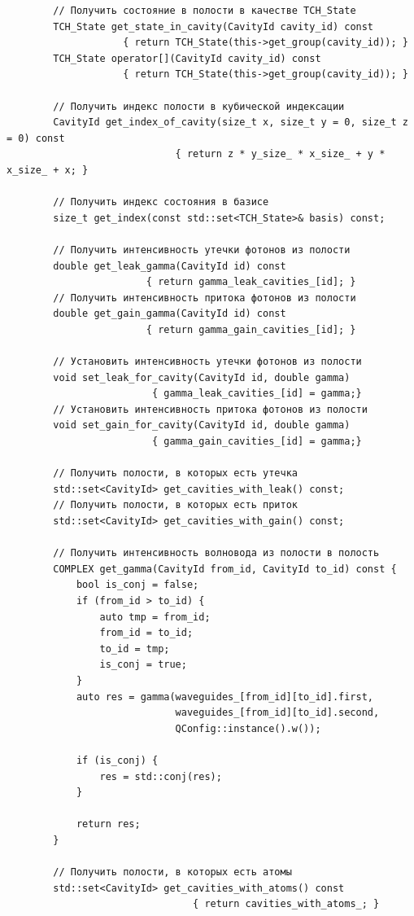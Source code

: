 \documentclass[12pt,fleqn]{article}
\begin{document}
\begin{mdframed}[linecolor=black, topline=true, bottomline=true,
leftline=false, rightline=false]
\begin{verbatim}
        // Получить состояние в полости в качестве TCH_State
        TCH_State get_state_in_cavity(CavityId cavity_id) const 
                    { return TCH_State(this->get_group(cavity_id)); }
        TCH_State operator[](CavityId cavity_id) const 
                    { return TCH_State(this->get_group(cavity_id)); }

        // Получить индекс полости в кубической индексации
        CavityId get_index_of_cavity(size_t x, size_t y = 0, size_t z = 0) const
                             { return z * y_size_ * x_size_ + y * x_size_ + x; }

        // Получить индекс состояния в базисе
        size_t get_index(const std::set<TCH_State>& basis) const;

        // Получить интенсивность утечки фотонов из полости
        double get_leak_gamma(CavityId id) const 
                        { return gamma_leak_cavities_[id]; }
        // Получить интенсивность притока фотонов из полости
        double get_gain_gamma(CavityId id) const 
                        { return gamma_gain_cavities_[id]; }

        // Установить интенсивность утечки фотонов из полости
        void set_leak_for_cavity(CavityId id, double gamma)
                         { gamma_leak_cavities_[id] = gamma;}
        // Установить интенсивность притока фотонов из полости
        void set_gain_for_cavity(CavityId id, double gamma)
                         { gamma_gain_cavities_[id] = gamma;}

        // Получить полости, в которых есть утечка
        std::set<CavityId> get_cavities_with_leak() const;
        // Получить полости, в которых есть приток
        std::set<CavityId> get_cavities_with_gain() const;

        // Получить интенсивность волновода из полости в полость
        COMPLEX get_gamma(CavityId from_id, CavityId to_id) const {
            bool is_conj = false;
            if (from_id > to_id) {
                auto tmp = from_id;
                from_id = to_id;
                to_id = tmp;
                is_conj = true;
            }
            auto res = gamma(waveguides_[from_id][to_id].first,
                             waveguides_[from_id][to_id].second,
                             QConfig::instance().w());

            if (is_conj) {
                res = std::conj(res);
            }

            return res;
        }

        // Получить полости, в которых есть атомы
        std::set<CavityId> get_cavities_with_atoms() const 
                                { return cavities_with_atoms_; }


\end{verbatim}
\end{mdframed}
\end{document}
